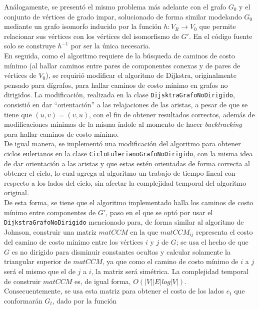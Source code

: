 \documentclass[11pt]{article}
\begin{document}
Análogamente, se presentó el mismo problema más adelante
con el grafo $G_0$ y el conjunto de vértices de grado impar,
solucionado de forma similar modelando $G_0$ mediante un grafo
isomorfo inducido por la función $h: V_R \rightarrow V_0 $ que
permite relacionar sus vértices con los vértices del isomorfismo
de $G'$. En el código fuente solo se construye $ h^{-1} $ por ser
la única necesaria. \\

En seguida, como el algoritmo requiere de la búsqueda de 
caminos de costo mínimo (al hallar caminos entre pares de componentes
conexas y de pares de vértices de $V_0$), se requirió modificar
el algoritmo de Dijkstra, originalmente pensado para dígrafos,
para hallar caminos de costo mínimo en grafos no dirigidos. 
La modificación, realizada en la clase \texttt{DijsktraGrafoNoDirigido},
consistió en dar ``orientación'' a las relajaciones de las aristas,
a pesar de que se tiene que $(u, v) = (v, u)$, con el fin de obtener
resultados correctos, además de modificaciones mínimas de la
misma índole al momento de hacer \emph{backtracking} para hallar
caminos de costo mínimo. \\

De igual manera, se implementó una modificación del algoritmo para
obtener ciclos eulerianos en la clase \texttt{CicloEulerianoGrafoNoDirigido},
con la misma idea de dar orientación a las aristas y que estas estén
orientadas de forma correcta al obtener el ciclo, lo cual agrega al
algoritmo un trabajo de tiempo lineal con respecto a los lados del
ciclo, sin afectar la complejidad temporal del algoritmo original. \\

De esta forma, se tiene que el algoritmo implementado halla los caminos
de costo mínimo entre componentes de $G'$, paso en el que se optó por usar
el \texttt{DijkstraGrafoNoDirigido} mencionado para, de forma similar
al algoritmo de Johnson, construir una matriz $matCCM$ en la que $matCCM_{ij}$
representa el costo del camino de costo mínimo entre los vértices $i$ y $j$ de
$G$; se usa el hecho de que $G$ es no dirigido para disminuir constantes ocultas
y calcular solamente la triangular superior de $matCCM$, ya que como el camino de 
costo mínimo de $i$ a $j$ será el mismo que el de $j$ a $i$, la matriz será simétrica.
La complejidad temporal de construir $matCCM$ es, de igual forma, $O(|V||E|log|V|)$. \\ 

Consecuentemente, se usa esta matriz para obtener el costo de los lados $e_t$ que
conformarán $G_t$, dado por la función
\end{document}
